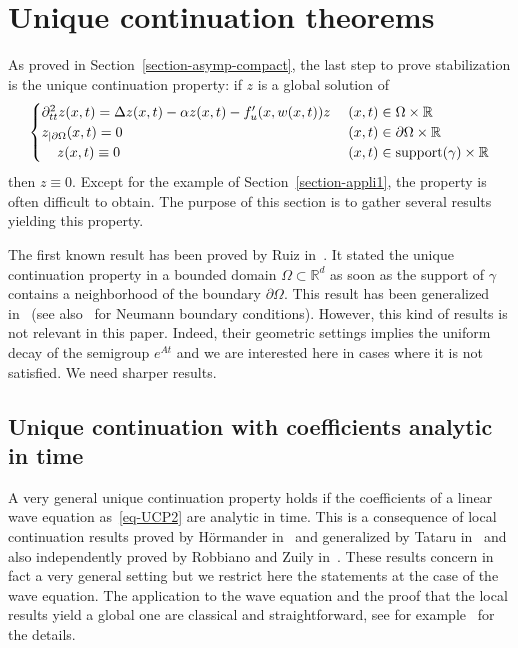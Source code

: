 \documentclass[10pt]{amsart}
\theoremstyle{definition}\newtheorem{defi}[theo]{Definition}\newtheorem{rema}[theo]{Remark}\newtheorem{exam}[theo]{Example}\newtheorem{exem}[theo]{Example}\newtheorem{nota}[theo]{Notation}
\newcommand{\RR}{\mathbb{R}}
\begin{document}
\section{Unique continuation theorems}\label{section-UCP}
As proved in Section~\ref{section-asymp-compact}, the last step to prove stabilization is the unique continuation property: if $z$ is a global solution of
\begin{equation}\label{eq-UCP2}
\begin{cases}
\partial_{tt}^2 z(x,t) = \Delta z(x,t) - \alpha z(x,t) - f'_u(x,w(x,t)) z\;&(x,t)\in\Omega\times\RR\\
z_{|\partial\Omega}(x,t)=0&(x,t)\in\partial\Omega\times \RR\\
\mkern20mu z(x,t)\equiv 0 & (x,t)\in \text{support}(\gamma)\times \RR
\end{cases}
\end{equation}
then $z\equiv 0$. Except for the example of Section~\ref{section-appli1}, the property is often difficult to obtain. The purpose of this section is to gather several results yielding this property.

The first known result has been proved by Ruiz in~\cite{Ruiz}. It stated the unique continuation property in a bounded domain $\Omega \subset\RR^d$ as soon as the support of $\gamma$ contains a neighborhood of the boundary $\partial\Omega$. This result has been generalized in~\cite{K-K} (see also~\cite{Las-Tri-Zha} for Neumann boundary conditions). However, this kind of results is not relevant in this paper. Indeed, their geometric settings implies the uniform decay of the semigroup $e^{At}$ and we are interested here in cases where it is not satisfied. We need sharper results.


\subsection{Unique continuation with coefficients analytic in time}

A very general unique continuation property holds if the coefficients of a linear wave equation as~\eqref{eq-UCP2} are analytic in time. This is a consequence of local continuation results proved by H\"ormander in~\cite{Hormander_uniq_analytic} and generalized by Tataru in~\cite{Tataru_uniq_analyticJMPA} and also independently proved by Robbiano and Zuily in~\cite{Rob-Zui}. These results concern in fact a very general setting but we restrict here the statements at the case of the wave equation. The application to the wave equation and the proof that the local results yield a global one are classical and straightforward, see for example~\cite[Corollary~3.2]{RC} for the details.
\end{document}
